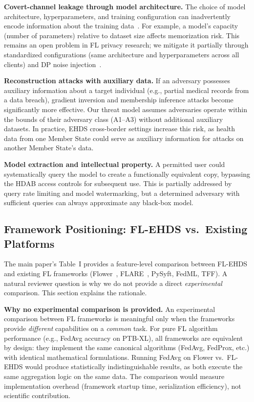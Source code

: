 \documentclass[conference]{IEEEtran}
\begin{document}
\textbf{Covert-channel leakage through model architecture.} The choice of model architecture, hyperparameters, and training configuration can inadvertently encode information about the training data~\cite{carlini2022privacy}. For example, a model's capacity (number of parameters) relative to dataset size affects memorization risk. This remains an open problem in FL privacy research; we mitigate it partially through standardized configurations (same architecture and hyperparameters across all clients) and DP noise injection~\cite{carlini2022privacy}.

\textbf{Reconstruction attacks with auxiliary data.} If an adversary possesses auxiliary information about a target individual (e.g., partial medical records from a data breach), gradient inversion and membership inference attacks become significantly more effective. Our threat model assumes adversaries operate within the bounds of their adversary class (A1--A3) without additional auxiliary datasets. In practice, EHDS cross-border settings increase this risk, as health data from one Member State could serve as auxiliary information for attacks on another Member State's data.

\textbf{Model extraction and intellectual property.} A permitted user could systematically query the model to create a functionally equivalent copy, bypassing the HDAB access controls for subsequent use. This is partially addressed by query rate limiting and model watermarking, but a determined adversary with sufficient queries can always approximate any black-box model.


\subsection{Framework Positioning: FL-EHDS vs.\ Existing Platforms}
\label{sec:framework_comparison}

The main paper's Table~I provides a feature-level comparison between FL-EHDS and existing FL frameworks (Flower~\cite{beutel2023flower}, FLARE~\cite{nvflare2023}, PySyft, FedML, TFF). A natural reviewer question is why we do not provide a direct \textit{experimental} comparison. This section explains the rationale.

\textbf{Why no experimental comparison is provided.} An experimental comparison between FL frameworks is meaningful only when the frameworks provide \textit{different} capabilities on a \textit{common} task. For pure FL algorithm performance (e.g., FedAvg accuracy on PTB-XL), all frameworks are equivalent by design: they implement the same canonical algorithms (FedAvg, FedProx, etc.) with identical mathematical formulations. Running FedAvg on Flower vs.\ FL-EHDS would produce statistically indistinguishable results, as both execute the same aggregation logic on the same data. The comparison would measure implementation overhead (framework startup time, serialization efficiency), not scientific contribution.
\end{document}
